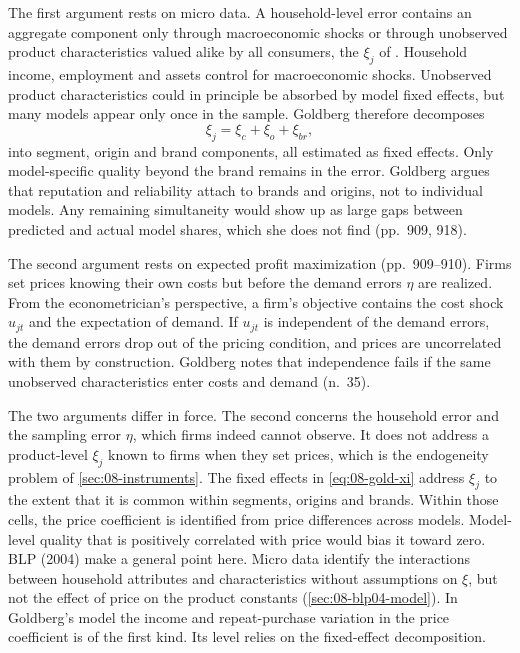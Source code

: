 The first argument rests on micro data. A household-level error contains an aggregate component only through
macroeconomic shocks or through unobserved product characteristics valued alike by all consumers, the $\xi_j$ of
\citet{Berry1994}. Household income, employment and assets control for macroeconomic shocks. Unobserved product
characteristics could in principle be absorbed by model fixed effects, but many models appear only once in the
sample. Goldberg therefore decomposes
\begin{equation}\label{eq:08-gold-xi}
\xi_j = \xi_c + \xi_o + \xi_{br},
\end{equation}
into segment, origin and brand components, all estimated as fixed effects. Only model-specific quality beyond
the brand remains in the error. Goldberg argues that reputation and reliability attach to brands and origins,
not to individual models. Any remaining simultaneity would show up as large gaps between predicted and actual
model shares, which she does not find (pp.~909, 918).

The second argument rests on expected profit maximization (pp.~909--910). Firms set prices knowing their own
costs but before the demand errors $\eta$ are realized. From the econometrician's perspective, a firm's
objective contains the cost shock $u_{jt}$ and the expectation of demand. If $u_{jt}$ is independent of the
demand errors, the demand errors drop out of the pricing condition, and prices are uncorrelated with them by
construction. Goldberg notes that independence fails if the same unobserved characteristics enter costs and
demand (n.~35).

 The two arguments differ in force. The second concerns the
household error and the sampling error $\eta$, which firms indeed cannot observe. It does not address a
product-level $\xi_j$ known to firms when they set prices, which is the endogeneity problem of
\cref{sec:08-instruments}. The fixed effects in \cref{eq:08-gold-xi} address $\xi_j$ to the extent that it is
common within segments, origins and brands. Within those cells, the price coefficient is identified from price
differences across models. Model-level quality that is positively correlated with price would bias it toward zero. BLP (2004)
make a general point here. Micro data identify the interactions between household attributes and
characteristics without assumptions on $\xi$, but not the effect of price on the product constants
(\cref{sec:08-blp04-model}). In Goldberg's model the income and repeat-purchase variation in the price
coefficient is of the first kind. Its level relies on the fixed-effect decomposition.

